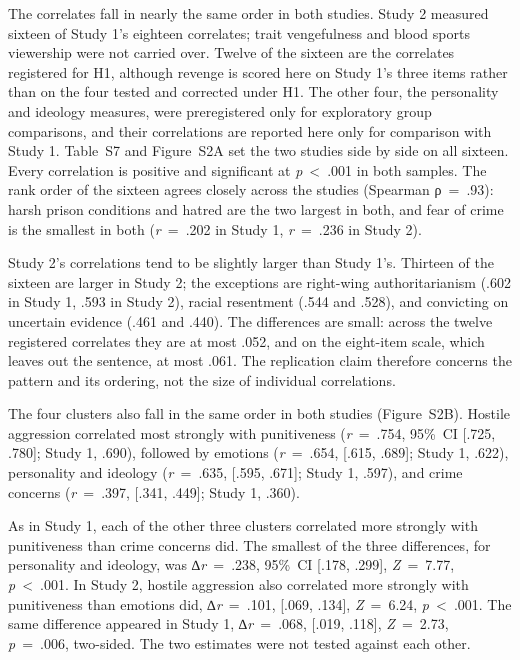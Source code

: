The correlates fall in nearly the same order in both studies. Study 2 measured sixteen of Study 1's eighteen correlates; trait vengefulness and blood sports viewership were not carried over. Twelve of the sixteen are the correlates registered for H1, although revenge is scored here on Study 1's three items rather than on the four tested and corrected under H1. The other four, the personality and ideology measures, were preregistered only for exploratory group comparisons, and their correlations are reported here only for comparison with Study 1. Table~S7 and Figure~S2A set the two studies side by side on all sixteen. Every correlation is positive and significant at \emph{p}~\textless{}~.001 in both samples. The rank order of the sixteen agrees closely across the studies (Spearman ρ~=~.93): harsh prison conditions and hatred are the two largest in both, and fear of crime is the smallest in both (\emph{r}~=~.202 in Study 1, \emph{r}~=~.236 in Study 2).

Study 2's correlations tend to be slightly larger than Study 1's. Thirteen of the sixteen are larger in Study 2; the exceptions are right-wing authoritarianism (.602 in Study 1, .593 in Study 2), racial resentment (.544 and .528), and convicting on uncertain evidence (.461 and .440). The differences are small: across the twelve registered correlates they are at most .052, and on the eight-item scale, which leaves out the sentence, at most .061. The replication claim therefore concerns the pattern and its ordering, not the size of individual correlations.

The four clusters also fall in the same order in both studies (Figure~S2B). Hostile aggression correlated most strongly with punitiveness (\emph{r}~=~.754, 95\%~CI {[}.725, .780{]}; Study 1, .690), followed by emotions (\emph{r}~=~.654, {[}.615, .689{]}; Study 1, .622), personality and ideology (\emph{r}~=~.635, {[}.595, .671{]}; Study 1, .597), and crime concerns (\emph{r}~=~.397, {[}.341, .449{]}; Study 1, .360).

As in Study 1, each of the other three clusters correlated more strongly with punitiveness than crime concerns did. The smallest of the three differences, for personality and ideology, was ∆\emph{r}~=~.238, 95\%~CI {[}.178, .299{]}, \emph{Z}~=~7.77, \emph{p}~\textless{}~.001. In Study 2, hostile aggression also correlated more strongly with punitiveness than emotions did, ∆\emph{r}~=~.101, {[}.069, .134{]}, \emph{Z}~=~6.24, \emph{p}~\textless{}~.001. The same difference appeared in Study 1, ∆\emph{r}~=~.068, {[}.019, .118{]}, \emph{Z}~=~2.73, \emph{p}~=~.006, two-sided. The two estimates were not tested against each other.

